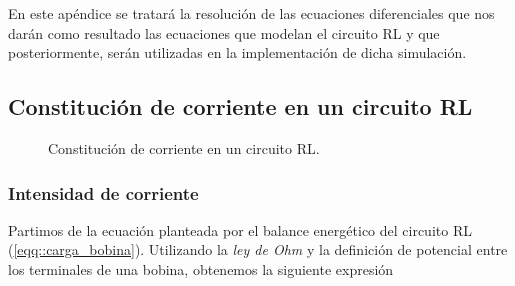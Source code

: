 \documentclass[../main.tex]{subfiles}
\begin{document}
\label{apendice_ecuaciones_2}


En este apéndice se tratará la resolución de las ecuaciones diferenciales que nos darán como resultado las ecuaciones que modelan el circuito RL y que posteriormente, serán utilizadas en la implementación de dicha simulación.

\subsection{Constitución de corriente en un circuito RL}

\begin{figure}[!h]
    \centering
    \caption{Constitución de corriente en un circuito RL.}
    \label{fig::carga_bobina_2}
\end{figure}

\subsubsection{Intensidad de corriente}
\label{part::carga_inductor_1}

Partimos de la ecuación planteada por el balance energético del circuito RL (\ref{eqq::carga_bobina}). Utilizando la \textit{ley de Ohm} y la definición de potencial entre los terminales de una bobina, obtenemos la siguiente expresión
\end{document}
